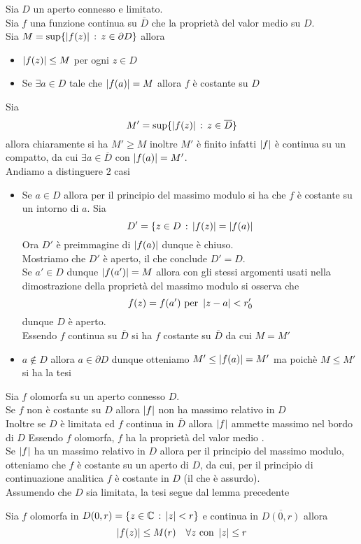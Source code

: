 \begin{cor}Sia $D$ un aperto connesso e limitato.\\
Sia $f$ una funzione continua su $\overline{D}$ che la propriet\`a del valor medio su $D$.\\
Sia $M=\sup \{ \left\vert f(z) \right\vert \, :\, z\in \partial D\}$ allora
\begin{itemize}
\item $\left\vert f(z) \right\vert \leq M$  per ogni $z\in D$
\item Se $\exists a\in D$ tale che $\left\vert f(a) \right\vert=M$ allora $f$ \`e costante su $D$ 
\end{itemize}
\proof Sia $$M'=\sup\{ \left\vert f(z) \right\vert \, : \, z\in \overline{D}\}$$
allora chiaramente si ha $M'\geq M$ inoltre $M'$ \`e finito infatti $\left\vert f \right\vert$ \`e continua su un compatto, da cui $\exists a\in \overline{D}$ con $\left\vert f(a) \right\vert=M'$.\\
Andiamo a distinguere $2$ casi
\begin{itemize}
\item Se $a\in D$ allora per il principio del massimo modulo si ha che $f$ \`e costante su un intorno di $a$. Sia 
$$ D'=\{ z\in D \, : \, \left\vert f(z) \right\vert=\left\vert f(a) \right\vert$$
Ora $D'$ \`e preimmagine di $\left\vert f(a) \right\vert$ dunque \`e chiuso.\\
Mostriamo che $D'$ \`e aperto, il che conclude $D'=D$.\\
Se $a'\in D$ dunque $\left\vert f(a') \right\vert=M$ allora con gli stessi argomenti usati nella dimostrazione della propriet\`a del massimo modulo si osserva che 
$$ f(z)= f(a')\text{ per } \left\vert z-a \right\vert<r_0' $$
dunque $D$ \`e aperto.\\
Essendo $f$ continua su $\overline{D}$ si ha $f$ costante su $\overline{D}$ da cui $M=M'$
\item $a\not \in D$ allora $a\in \partial D$ dunque otteniamo $M'\leq \left\vert f(a) \right\vert=M'$ ma poich\`e $M\leq M'$ si ha la tesi
\end{itemize}
\end{cor}
\begin{cor}\bianco
Sia $f$ olomorfa su un aperto connesso $D$.\\
Se $f$ non \`e costante su $D$ allora $\left\vert f \right\vert$ non ha massimo relativo in $D$\\
Inoltre se $D$ \`e limitata ed $f$ continua in $\overline{D}$ allora $\left\vert f \right\vert$ ammette massimo nel bordo di $D$ 
\proof Essendo $f$ olomorfa, $f$ ha la propriet\`a del valor medio .\\
Se $\left\vert f \right\vert$ ha un massimo relativo in $D$ allora per il principio del massimo modulo, otteniamo che $f$ \`e costante su un aperto di $D$, da cui, per il principio di continuazione analitica $f$ \`e costante in $D$ (il che \`e assurdo).\\
Assumendo che $D$ sia limitata, la tesi segue dal lemma precedente
\end{cor}
\begin{oss}Sia $f$ olomorfa in $D(0,r)=\{ z\in \mathbb{C}\, :\, \left\vert z \right\vert <r\}$ e continua in $\overline{D(0,r)}$ allora 
$$ \left\vert f(z) \right\vert \leq M(r) \quad\forall z\text{ con } \left\vert z \right\vert \leq r $$
\end{oss}
